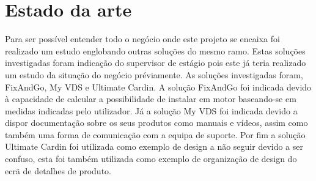  

 

 

 \section{Estado da arte}
 Para ser possível entender todo o negócio onde este projeto se encaixa foi realizado um estudo
 englobando outras soluções do mesmo ramo. Estas soluções investigadas foram indicação do supervisor
 de estágio pois este já teria realizado um estudo da situação do negócio préviamente.
 As soluções investigadas foram, FixAndGo, My VDS e Ultimate Cardin. A solução FixAndGo 
 foi indicada devido à capacidade de calcular a possibilidade de instalar em motor baseando-se em
 medidas indicadas pelo utilizador. Já a solução My VDS foi indicada devido a dispor documentação sobre
 os seus produtos como manuais e vídeos, assim como também uma forma de comunicação com a equipa de suporte.
 Por fim a solução Ultimate Cardin foi utilizada como exemplo de design a não seguir devido a ser confuso, 
 esta foi também utilizada como exemplo de organização de design do ecrã de detalhes de produto.

 

 \newpage

 

 

 

 

 \newpage

 

 \newpage

 

 \newpage



 \newpage

 

 \newpage

 

 \newpage

 

 \newpage

 

 

 

 \newpage

 